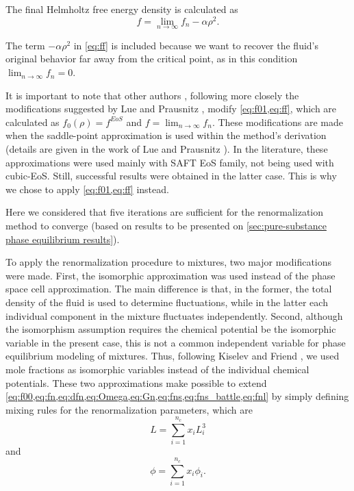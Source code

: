 \documentclass[preprint,12pt,3p]{elsarticle}
\begin{document}
The final Helmholtz free energy density is calculated as
\begin{equation} \label{eq:ff}
f = \lim_{n \rightarrow \infty} f_{n} - \alpha\rho^2.
\end{equation}

The term $-\alpha\rho^2$ in \cref{eq:ff} is included because we want to recover the fluid's original behavior far away from the critical point, as in this condition $\lim_{n \rightarrow \infty} f_{n} = 0$.

It is important to note that other authors \cite{llovell2004thermodynamic,llovell2006global,llovell2006prediction,bymaster2008renormalization,tang2010renormalization}, following more closely the modifications suggested by Lue and Prausnitz \cite{lue1998brenormalization}, modify \cref{eq:f01,eq:ff}, which are calculated as
$f_{0}(\rho) = f^{EoS}$
and
$f = \lim_{n \rightarrow \infty} f_{n}$.
These modifications are made when the saddle-point approximation is used within the method's derivation (details are given in the work of Lue and Prausnitz \cite{lue1998brenormalization}).
In the literature, these approximations were used mainly with SAFT EoS family, not being used with cubic-EoS.
Still, successful results were obtained in the latter case.
This is why we chose to apply \cref{eq:f01,eq:ff} instead.%

Here we considered that five iterations are sufficient for the renormalization method to converge (based on results to be presented on \cref{sec:pure-substance phase equilibrium results}).

To apply the renormalization procedure to mixtures, two major modifications were made.
First, the isomorphic approximation \citep{fisher1968renormalization} was used instead of the phase space cell approximation.
The main difference is that, in the former, the total density of the fluid is used to determine fluctuations, while in the latter each individual component in the mixture fluctuates independently.
Second, although the isomorphism assumption requires the chemical potential be the isomorphic variable in the present case, this is not a common independent variable for phase equilibrium modeling of mixtures.
Thus, following Kiselev and Friend \citep{kiselev1999cubic}, we used mole fractions as isomorphic variables instead of the individual chemical potentials.
These two approximations make possible to extend \cref{eq:f00,eq:fn,eq:dfn,eq:Omega,eq:Gn,eq:fns,eq:fns_battle,eq:fnl} by simply defining mixing rules for the renormalization parameters, which are
\begin{equation} \label{eq:mix_L}
L = \sum_{i=1}^{n_c}x_{i}L_{i}^{3}
\end{equation}
and
\begin{equation} \label{eq:mix_phi}
\phi = \sum_{i=1}^{n_c}x_{i}\phi_{i}.
\end{equation}
\end{document}

